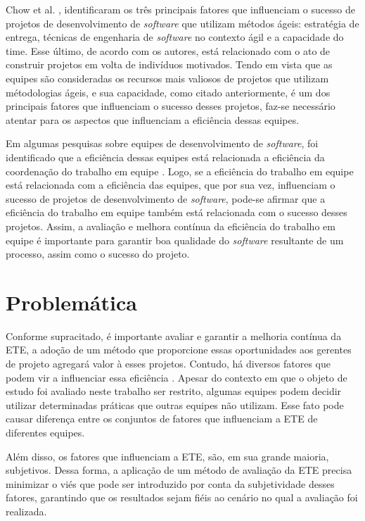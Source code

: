 Chow et al. \cite{chow}, identificaram os três principais fatores que influenciam o sucesso de projetos de desenvolvimento de \textit{software} que utilizam métodos ágeis: estratégia de entrega, técnicas de engenharia de \textit{software} no contexto ágil e a capacidade do time. Esse último, de acordo com os autores, está relacionado com o ato de construir projetos em volta de indivíduos motivados. Tendo em vista que as equipes são consideradas os recursos mais valiosos de projetos que utilizam métodologias ágeis, e sua capacidade, como citado anteriormente, é um dos principais fatores que influenciam o sucesso desses projetos, faz-se necessário atentar para os aspectos que influenciam a eficiência dessas equipes.

Em algumas pesquisas sobre equipes de desenvolvimento de \textit{software}, foi identificado que a eficiência dessas equipes está relacionada a eficiência da coordenação do trabalho em equipe \cite{kraut} \cite{hoegl}. Logo, se a eficiência do trabalho em equipe está relacionada com a eficiência das equipes, que por sua vez, influenciam o sucesso de projetos de desenvolvimento de \textit{software}, pode-se afirmar que a eficiência do trabalho em equipe também está relacionada com o sucesso desses projetos. Assim, a avaliação e melhora contínua da eficiência do trabalho em equipe é importante para garantir boa qualidade do \textit{software} resultante de um processo, assim como o sucesso do projeto.

\section{Problemática}
\label{intro:prob}

Conforme supracitado, é importante avaliar e garantir a melhoria contínua da ETE, a adoção de um método que proporcione essas oportunidades aos gerentes de projeto agregará valor à esses projetos. Contudo, há diversos fatores que podem vir a influenciar essa eficiência \cite{}. Apesar do contexto em que o objeto de estudo foi avaliado neste trabalho ser restrito, algumas equipes podem decidir utilizar determinadas práticas que outras equipes não utilizam. Esse fato pode causar diferença entre os conjuntos de fatores que influenciam a ETE de diferentes equipes.

Além disso, os fatores que influenciam a ETE, são, em sua grande maioria, subjetivos. Dessa forma, a aplicação de um método de avaliação da ETE precisa minimizar o viés que pode ser introduzido por conta da subjetividade desses fatores, garantindo que os resultados sejam fiéis ao cenário no qual a avaliação foi realizada.

